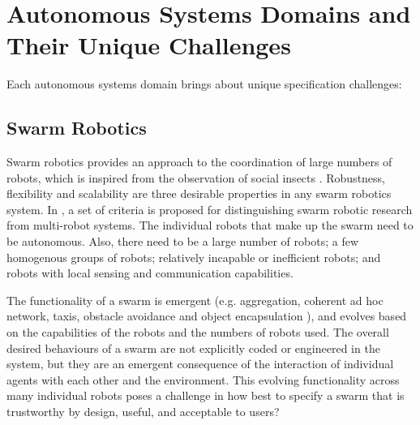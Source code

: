 \documentclass[sigconf]{acmart}
\begin{document}
\section{Autonomous Systems Domains and Their Unique Challenges}
Each autonomous systems domain brings about unique specification challenges: 


\newpage
\subsection{Swarm Robotics}
Swarm robotics provides an approach to the coordination of large numbers of robots, which is inspired from the observation of social insects \cite{Sahin2005}. 
Robustness, flexibility and scalability are three desirable properties in any swarm robotics system. 
In \cite{Sahin2005}, a set of criteria is proposed for distinguishing swarm robotic research from multi-robot systems. 
The individual robots that make up the swarm need to be autonomous. Also, there need to be a large number of robots; a few homogenous groups of robots; relatively incapable or inefficient robots; and robots with local sensing and communication capabilities. 

The functionality of a swarm is emergent (e.g. aggregation, coherent ad hoc network, taxis, obstacle avoidance and object encapsulation \cite{Winfield2006}), and evolves based on the capabilities of the robots and the numbers of robots used. 
The overall desired behaviours of a swarm are not explicitly coded or engineered in the system, but they are an emergent consequence of the interaction of individual agents with each other and the environment.
This evolving functionality across many individual robots poses a challenge in how best to specify a swarm that is trustworthy by design, useful, and acceptable to users?
\end{document}
